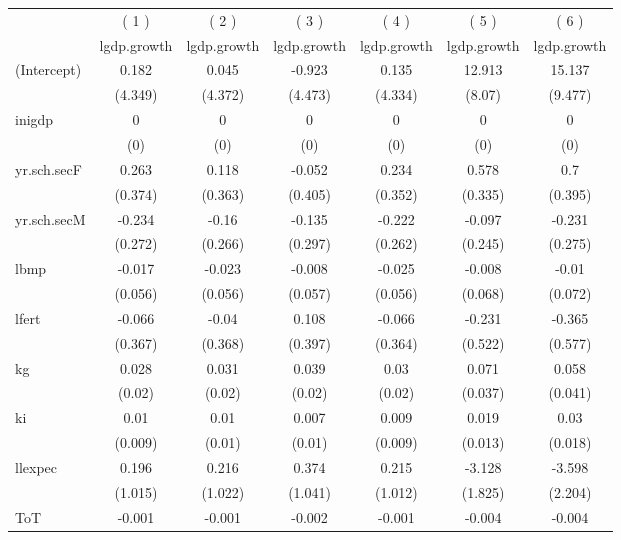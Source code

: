 \documentclass{article}\usepackage{graphicx, color}
\begin{document}
\begin{table}
\centering
\small
\begin{tabular}{l*{6}{c}}
\hline\hline
	 &\multicolumn{1}{c}{( 1 )}  	 &\multicolumn{1}{c}{( 2 )}  	 &\multicolumn{1}{c}{( 3 )}  	 &\multicolumn{1}{c}{( 4 )}  	 &\multicolumn{1}{c}{( 5 )}  	 &\multicolumn{1}{c}{( 6 )}  \\  &\multicolumn{1}{c}{lgdp.growth} &\multicolumn{1}{c}{lgdp.growth} &\multicolumn{1}{c}{lgdp.growth} &\multicolumn{1}{c}{lgdp.growth} &\multicolumn{1}{c}{lgdp.growth} &\multicolumn{1}{c}{lgdp.growth} \\
\hline
(Intercept) 		&0.182 		&0.045 		&-0.923 		&0.135 		&12.913 		&15.137 \\
  		&(4.349) 		&(4.372) 		&(4.473) 		&(4.334) 		&(8.07) 		&(9.477) \\
inigdp 		&0 		&0 		&0 		&0 		&0 		&0 \\
  		&(0) 		&(0) 		&(0) 		&(0) 		&(0) 		&(0) \\
yr.sch.secF 		&0.263 		&0.118 		&-0.052 		&0.234 		&0.578\sym{*} 		&0.7\sym{*} \\
  		&(0.374) 		&(0.363) 		&(0.405) 		&(0.352) 		&(0.335) 		&(0.395) \\
yr.sch.secM 		&-0.234 		&-0.16 		&-0.135 		&-0.222 		&-0.097 		&-0.231 \\
  		&(0.272) 		&(0.266) 		&(0.297) 		&(0.262) 		&(0.245) 		&(0.275) \\
lbmp 		&-0.017 		&-0.023 		&-0.008 		&-0.025 		&-0.008 		&-0.01 \\
  		&(0.056) 		&(0.056) 		&(0.057) 		&(0.056) 		&(0.068) 		&(0.072) \\
lfert 		&-0.066 		&-0.04 		&0.108 		&-0.066 		&-0.231 		&-0.365 \\
  		&(0.367) 		&(0.368) 		&(0.397) 		&(0.364) 		&(0.522) 		&(0.577) \\
kg 		&0.028 		&0.031 		&0.039\sym{*} 		&0.03 		&0.071\sym{*} 		&0.058 \\
  		&(0.02) 		&(0.02) 		&(0.02) 		&(0.02) 		&(0.037) 		&(0.041) \\
ki 		&0.01 		&0.01 		&0.007 		&0.009 		&0.019 		&0.03 \\
  		&(0.009) 		&(0.01) 		&(0.01) 		&(0.009) 		&(0.013) 		&(0.018) \\
llexpec 		&0.196 		&0.216 		&0.374 		&0.215 		&-3.128\sym{*} 		&-3.598 \\
  		&(1.015) 		&(1.022) 		&(1.041) 		&(1.012) 		&(1.825) 		&(2.204) \\
ToT 		&-0.001 		&-0.001 		&-0.002 		&-0.001 		&-0.004 		&-0.004 \\

\end{tabular}
\end{table}
\end{document}
